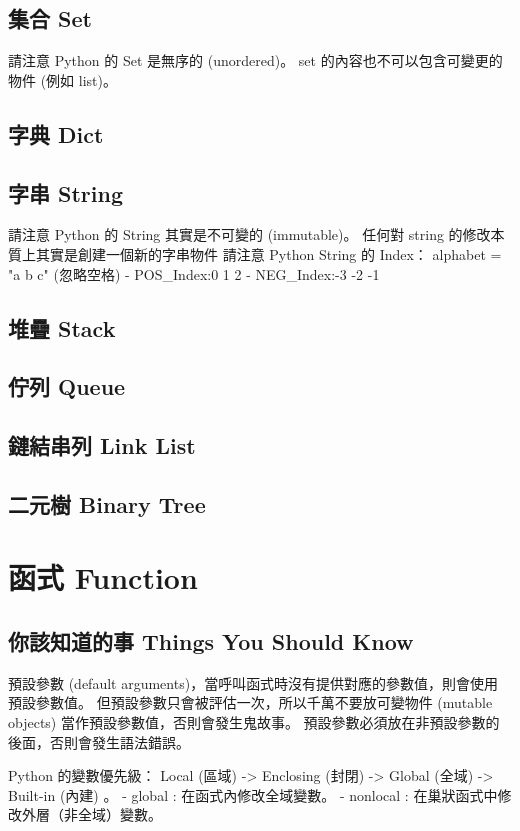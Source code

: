 \documentclass[a4paper,10pt,twocolumn,oneside]{article}
\begin{document}
\subsection{集合 Set}
請注意 Python 的 Set 是無序的 (unordered)。
set 的內容也不可以包含可變更的物件 (例如 list)。

\subsection{字典 Dict}

\subsection{字串 String}
請注意 Python 的 String 其實是不可變的 (immutable)。
任何對 string 的修改本質上其實是創建一個新的字串物件
請注意 Python String 的 Index：
alphabet = "a   b  c" (忽略空格)
- POS\_Index:0   1  2
- NEG\_Index:-3 -2 -1

\subsection{堆疊 Stack}

\subsection{佇列 Queue}

\subsection{鏈結串列 Link List}

\subsection{二元樹 Binary Tree}


\section{函式 Function}
\subsection{你該知道的事 Things You Should Know}
預設參數 (default arguments)，當呼叫函式時沒有提供對應的參數值，則會使用預設參數值。
但預設參數只會被評估一次，所以千萬不要放可變物件 (mutable objects) 當作預設參數值，否則會發生鬼故事。
預設參數必須放在非預設參數的後面，否則會發生語法錯誤。


Python 的變數優先級：
Local (區域) -> Enclosing (封閉) -> Global (全域) -> Built-in (內建) 。
- global : 在函式內修改全域變數。
- nonlocal : 在巢狀函式中修改外層（非全域）變數。
\end{document}
